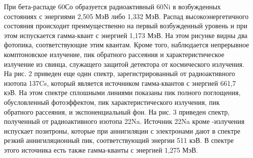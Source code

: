 При бета-распаде 60Со образуется радиоактивный 60Ni в возбужденных состояниях с
энергиями 2,505 МэВ либо 1,332 МэВ. Распад высокоэнергетичного состояния
происходит преимущественно на первый возбужденный уровень и при этом испускается
гамма-квант с энергией 1,173 МэВ. На этом рисунке видны два фотопика,
соответствующие этим квантам. Кроме того, наблюдается непрерывное комптоновское
излучение, пик обратного рассеяния и характеристическое излучение из свинца,
служащего защитой детектора от космического излучения. На рис. 2 приведен еще
один спектр, зарегистрированный от радиоактивного изотопа 137Cs, который
является источником гамма-квантов с энергией 661,7 кэВ. На этом спектре
сплошными линиями показаны пик полного поглощения, обусловленный фотоэффектом,
пик характеристического излучения, пик обратного рассеяния, и экспоненциальный
фон. На рис. 3 приведен спектр, полученный от радиоактивного изотопа 22Na.
Источник 22Na кроме -излучения испускает позитроны, которые при аннигиляции с
электронами дают в спектре резкий аннигиляционный пик, соответствующий энергии
511 кэВ. В спектре этого источника есть также гамма-кванты с энергией 1,275 МэВ.

